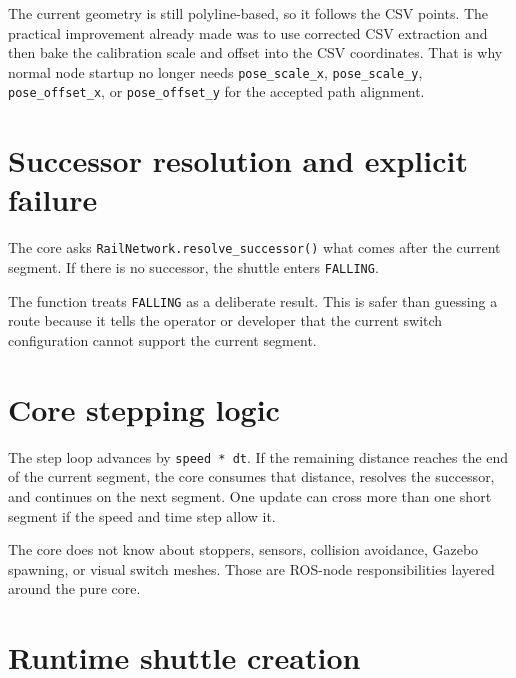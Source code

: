 \documentclass[12pt,a4paper]{report}
\newcommand{\codenext}[1]{\par\Needspace{#1\baselineskip}}
\begin{document}
The current geometry is still polyline-based, so it follows the CSV points.
The practical improvement already made was to use corrected CSV extraction and
then bake the calibration scale and offset into the CSV coordinates. That is
why normal node startup no longer needs \texttt{pose\_scale\_x},
\texttt{pose\_scale\_y}, \texttt{pose\_offset\_x}, or
\texttt{pose\_offset\_y} for the accepted path alignment.

\section{Successor resolution and explicit failure}

The core asks \texttt{RailNetwork.resolve\_successor()} what comes after the
current segment. If there is no successor, the shuttle enters
\texttt{FALLING}.

\codenext{42}


The function treats \texttt{FALLING} as a deliberate result. This is safer than
guessing a route because it tells the operator or developer that the current
switch configuration cannot support the current segment.

\section{Core stepping logic}

The step loop advances by \texttt{speed * dt}. If the remaining distance reaches
the end of the current segment, the core consumes that distance, resolves the
successor, and continues on the next segment. One update can cross more than one
short segment if the speed and time step allow it.

\codenext{34}


The core does not know about stoppers, sensors, collision avoidance, Gazebo
spawning, or visual switch meshes. Those are ROS-node responsibilities layered
around the pure core.

\section{Runtime shuttle creation}
\end{document}
